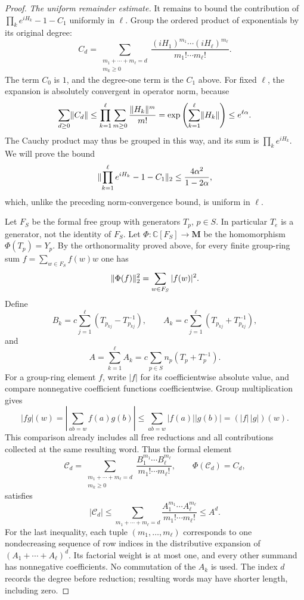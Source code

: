 \begin{proof}
\smallskip\noindent
\emph{The uniform remainder estimate.}
It remains to bound the contribution of
$\prod_k e^{iH_k}-1-C_1$ uniformly in $\ell$.
Group the ordered product of exponentials by its original degree:
\[
  C_d=\sum_{\substack{m_1+\cdots+m_\ell=d\\m_k\ge0}}
       \frac{(iH_1)^{m_1}\cdots(iH_\ell)^{m_\ell}}
            {m_1!\cdots m_\ell!}.
\]
The term $C_0$ is $1$, and the degree-one term is the $C_1$ above.
For fixed $\ell$, the expansion is absolutely convergent in
operator norm, because
\[
  \sum_{d\ge0}\lVert C_d\rVert
  \le\prod_{k=1}^{\ell}
          \sum_{m\ge0}\frac{\lVert H_k\rVert^m}{m!}
  =\exp\left(\sum_{k=1}^{\ell}\lVert H_k\rVert\right)
  \le e^{\ell\alpha}.
\]
The Cauchy product may thus be grouped in this way, and its sum is
$\prod_k e^{iH_k}$.
We will prove the bound
\begin{equation}\label{eq:perturbation-remainder}
  \lVert \prod_{k=1}^{\ell}e^{iH_k}-1-C_1\rVert_2
  \le\frac{4\alpha^2}{1-2\alpha},
\end{equation}
which, unlike the preceding norm-convergence bound, is uniform
in $\ell$.

Let $F_S$ be the formal free group with generators $T_p$, $p\in S$.
In particular $T_e$ is a generator, not the identity of $F_S$.
Let $\Phi:\mathbb C[F_S]\to\mathbf M$ be the homomorphism
$\Phi(T_p)=Y_p$.
By the orthonormality proved above, for every finite group-ring sum
$f=\sum_{w\in F_S}f(w)w$ one has
\begin{equation}\label{eq:perturbation-coefficient-isometry}
  \lVert \Phi(f)\rVert_2^2=\sum_{w\in F_S}|f(w)|^2.
\end{equation}
Define
\[
  B_k=c\sum_{j=1}^{\ell}
                (T_{p_{kj}}-T_{p_{kj}}^{-1}),\qquad
  A_k=c\sum_{j=1}^{\ell}
                (T_{p_{kj}}+T_{p_{kj}}^{-1}),
\]
and
\[
  A=\sum_{k=1}^{\ell}A_k
    =c\sum_{p\in S}n_p(T_p+T_p^{-1}).
\]
For a group-ring element $f$, write $|f|$ for its coefficientwise
absolute value, and compare nonnegative coefficient functions
coefficientwise.  Group multiplication gives
\[
  |fg|(w)=\left|\sum_{ab=w}f(a)g(b)\right|
      \le\sum_{ab=w}|f(a)||g(b)|=(|f|\,|g|)(w).
\]
This comparison already includes all free reductions and all
contributions collected at the same resulting word.
Thus the formal element
\[
  \mathcal C_d=
     \sum_{\substack{m_1+\cdots+m_\ell=d\\m_k\ge0}}
        \frac{B_1^{m_1}\cdots B_\ell^{m_\ell}}
             {m_1!\cdots m_\ell!},
  \qquad \Phi(\mathcal C_d)=C_d,
\]
satisfies
\begin{equation}\label{eq:perturbation-majorization}
  |\mathcal C_d|
   \le\sum_{m_1+\cdots+m_\ell=d}
            \frac{A_1^{m_1}\cdots A_\ell^{m_\ell}}
                 {m_1!\cdots m_\ell!}
   \le A^d.
\end{equation}
For the last inequality, each tuple $(m_1,\ldots,m_\ell)$
corresponds to one nondecreasing sequence of row indices in the
distributive expansion of $(A_1+\cdots+A_\ell)^d$.
Its factorial weight is at most one, and every other summand has
nonnegative coefficients.  No commutation of the $A_k$ is used.
The index $d$ records the degree before reduction; resulting words
may have shorter length, including zero.


\end{proof}
